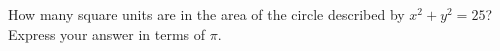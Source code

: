 How many square units are in the area of the circle described by $x^2+y^2=25$? Express your answer in terms of $\pi$.

